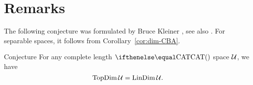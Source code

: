 \section{Remarks}

The following conjecture was formulated by Bruce Kleiner \cite{kleiner}, see also \cite[p.~133]{gromov:asymt-inv}.
For separable spaces, it follows from Corollary~\ref{cor:dim-CBA}.

\begin{thm}{Conjecture}
For any complete length $\CAT{}$ space $\mathcal{U}$, we have
\[\mathop{\rm TopDim}\nolimits\mathcal{U}
=
\mathop{\rm LinDim}\nolimits\mathcal{U}.\]

\end{thm}



















